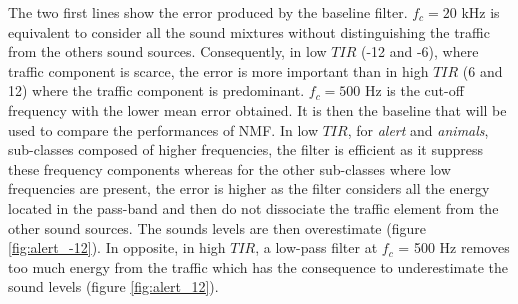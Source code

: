 \documentclass[twocolumn,a4paper,10pt]{article}
\begin{document}
The two first lines show the error produced by the baseline filter. $f_c = 20 $ kHz is equivalent to consider all the sound mixtures without distinguishing the traffic from the others sound sources. Consequently, in low $TIR$ (-12 and -6), where traffic component is scarce, the error is more important than in high $TIR$ (6 and 12) where the traffic component is predominant. $f_c = 500$ Hz is the cut-off frequency with the lower mean error obtained. It is then the baseline that will be used to compare the performances of NMF. In low $TIR$, for \textit{alert} and \textit{animals}, sub-classes composed of higher frequencies, the filter is efficient as it suppress these frequency components whereas for the other sub-classes where low frequencies are present, the error is higher as the filter considers all the energy located in the pass-band and then do not dissociate the traffic element from the other sound sources. The sounds levels are then overestimate (figure \ref{fig:alert_-12}). In opposite, in high $TIR$, a low-pass filter at $f_c$ = 500 Hz removes too much energy from the traffic which has the consequence to underestimate the sound levels (figure \ref{fig:alert_12}).\\
\end{document}

